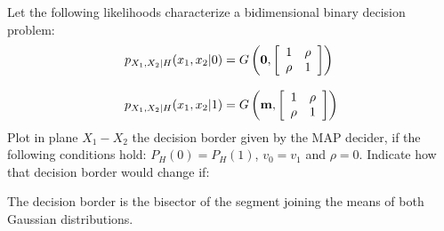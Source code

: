 \question Let the following likelihoods characterize a bidimensional binary decision problem:
 $$ \begin{array}{l} 
					   p_{X_1,X_2|H}(x_1,x_2 | 0) = G \left( {\bf 0}, \left[ \begin{array}{cc}  
					   1 & \rho \\ \rho & 1					   
					    \end{array}  \right] \right)\\ \\
					  p_{X_1,X_2|H}(x_1,x_2 | 1) = G \left( {\bf m}, \left[ \begin{array}{cc}  
					   1 & \rho \\ \rho & 1					   
					    \end{array}  \right] \right)	  
  \end{array}$$
Plot in plane $X_1-X_2$ the decision border given by the MAP decider, if the following conditions hold: $P_H(0)= P_H (1)$, $v_0=v_1$ and $\rho=0$. Indicate how that decision border would change if:

\begin{solution}
The decision border is the bisector of the segment joining the means of both Gaussian distributions.
\end{solution}

\fi